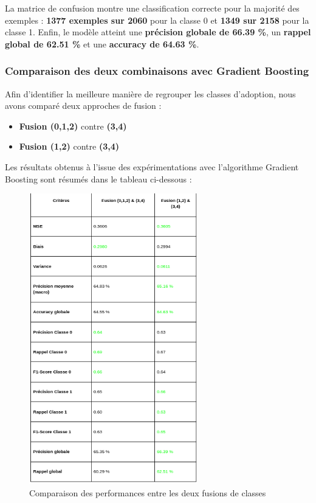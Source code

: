 \documentclass[a4paper,12pt]{article}
\begin{document}
La matrice de confusion montre une classification correcte pour la majorité des exemples : \textbf{1377 exemples sur 2060} pour la classe 0 et \textbf{1349 sur 2158} pour la classe 1. Enfin, le modèle atteint une \textbf{précision globale de 66.39 \%}, un \textbf{rappel global de 62.51 \%} et une \textbf{accuracy de 64.63 \%}.
\subsubsection{Comparaison des deux combinaisons avec Gradient Boosting}

Afin d’identifier la meilleure manière de regrouper les classes d’adoption, nous avons comparé deux approches de fusion :
\begin{itemize}
    \item \textbf{Fusion (0,1,2)} contre \textbf{(3,4)}
    \item \textbf{Fusion (1,2)} contre \textbf{(3,4)}
\end{itemize}

Les résultats obtenus à l’issue des expérimentations avec l’algorithme Gradient Boosting sont résumés dans le tableau ci-dessous :

\begin{figure}[H]
    \centering
    \includegraphics[width=0.65\textwidth]{capture_fusion_gb_tableau.png}
    \caption{Comparaison des performances entre les deux fusions de classes}
    \label{fig:comparaison_fusion_gradient_boosting}
\end{figure}
\end{document}
